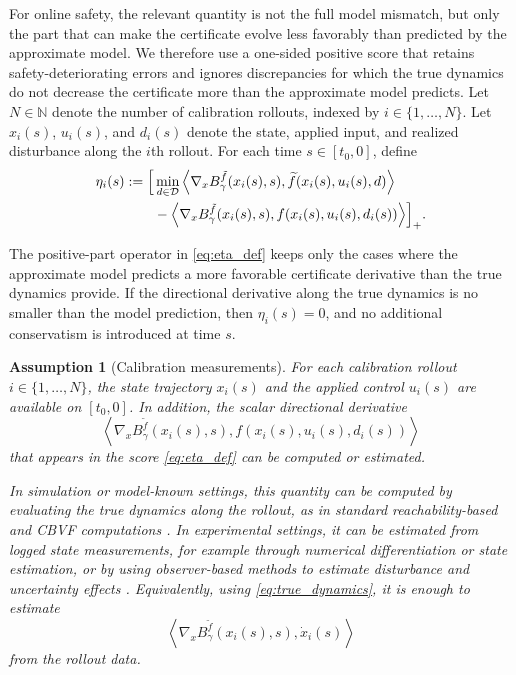 \documentclass[letterpaper,10pt,conference]{ieeeconf}
\newtheorem{assumption}{Assumption}
\newcommand{\N}{\mathbb{N}}
\newcommand{\Bm}{B_{\gamma}^{\tilde f}}
\newcommand{\fapp}{\widetilde{f}}
\newcommand{\xv}{x}
\newcommand{\uv}{u}
\newcommand{\dv}{d}
\newcommand{\Dv}{\mathcal{D}}
\newcommand{\ip}[2]{\left\langle #1,#2 \right\rangle}
\begin{document}
For online safety, the relevant quantity is not the full model mismatch, but
only the part that can make the certificate evolve less favorably than predicted
by the approximate model. We therefore use a one-sided positive score that
retains safety-deteriorating errors and ignores discrepancies for which the
true dynamics do not decrease the certificate more than the approximate model
predicts.
Let $N\in\N$ denote the number of calibration rollouts, indexed by
$i\in\{1,\dots,N\}$. Let $\xv_i(s)$, $\uv_i(s)$, and $\dv_i(s)$ denote the
state, applied input, and realized disturbance along the $i$th rollout. For
each time $s\in[t_0,0]$, define
\begin{equation}
\begin{aligned}
    \eta_i(s)
    :=
    \Bigl[
    &\min_{\dv\in\Dv}
    \ip{\nabla_{\xv}\Bm(\xv_i(s),s)}
    {\fapp(\xv_i(s),\uv_i(s),\dv)} \\
    &-
    \ip{\nabla_{\xv}\Bm(\xv_i(s),s)}
    {f(\xv_i(s),\uv_i(s),\dv_i(s))}
    \Bigr]_+ .
\end{aligned}
\label{eq:eta_def}
\end{equation}

The positive-part operator in \eqref{eq:eta_def} keeps only the cases where the
approximate model predicts a more favorable certificate derivative than the
true dynamics provide. If the directional derivative along the true dynamics is
no smaller than the model prediction, then $\eta_i(s)=0$, and no additional
conservatism is introduced at time $s$.
\begin{assumption}[Calibration measurements]
\label{ass:calibration_access}
For each calibration rollout $i\in\{1,\dots,N\}$, the state trajectory
$\xv_i(s)$ and the applied control $\uv_i(s)$ are available on $[t_0,0]$.
In addition, the scalar directional derivative
\[
    \ip{\nabla_{\xv}\Bm(\xv_i(s),s)}
    {f(\xv_i(s),\uv_i(s),\dv_i(s))}
\]
that appears in the score \eqref{eq:eta_def} can be computed or estimated.

In simulation or model-known settings, this quantity can be computed by
evaluating the true dynamics along the rollout, as in standard
reachability-based and CBVF computations
\cite{mitchell2005time,choi2021cbvf}. In experimental settings, it can be
estimated from logged state measurements, for example through numerical
differentiation or state estimation, or by using observer-based methods to
estimate disturbance and uncertainty effects
\cite{vanbreugel2020numerical,alan2023dobcbf,chen2023robusteso}. Equivalently,
using \eqref{eq:true_dynamics}, it is enough to estimate
\[
    \ip{\nabla_{\xv}\Bm(\xv_i(s),s)}{\dot{\xv}_i(s)}
\]
from the rollout data.
\end{assumption}
\end{document}
